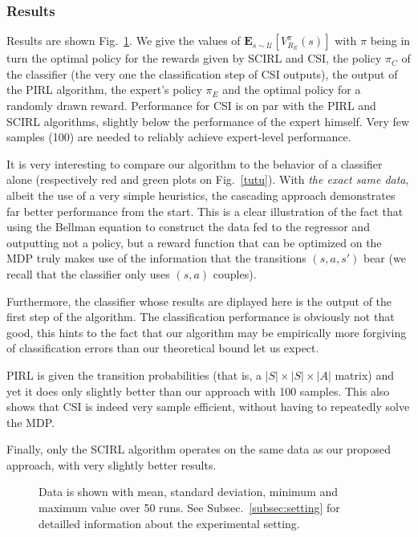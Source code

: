 \documentclass[smallextended]{svjour3}
\begin{document}
\subsubsection{Results}
\label{subsubsec:hresults}
Results are shown Fig.~\ref{fig:Highway}. We give the values of $\mathbf{E}_{s\sim\mathcal{U}}[V^{\pi}_{R_E}(s)]$ with $\pi$ being in turn the optimal policy for the rewards given by SCIRL and CSI, the policy $\pi_C$ of the classifier (the very one the classification step of CSI outputs), the output of the PIRL algorithm, the expert's policy $\pi_E$ and the optimal policy for a randomly drawn reward. Performance for CSI is on par with the PIRL and SCIRL algorithms, slightly below the performance of the expert himself. Very few samples (100) are needed to reliably achieve expert-level performance.

It is very interesting to compare our algorithm to the behavior of a classifier alone (respectively red and green plots on Fig.~\ref{tutu}). With \emph{the exact same data}, albeit the use of a very simple heuristics, the cascading approach demonstrates far better performance from the start. This is a clear illustration of the fact that using the Bellman equation to construct the data fed to the regressor and outputting not a policy, but a reward function that can be optimized on the MDP truly makes use of the information that the transitions $(s,a,s')$ bear (we recall that the classifier only uses $(s,a)$ couples).

Furthermore, the classifier whose results are diplayed here is the output of the first step of the algorithm. The classification performance is obviously not that good, this hints to the fact that our algorithm may be empirically more forgiving of classification errors than our theoretical bound let us expect.

PIRL is given the transition probabilities (that is, a $|S|\times |S|\times |A|$ matrix) and yet it does only slightly better than our approach with 100 samples. This also shows that CSI is indeed very sample efficient, without having to repeatedly solve the MDP.

Finally, only the SCIRL algorithm operates on the same data as our proposed approach, with very slightly better results.

\begin{figure}

  \caption{Data is shown with mean, standard deviation, minimum and maximum value over 50 runs. See Subsec.~\ref{subsec:setting} for detailled information about the experimental setting.}
  \label{fig:Highway}
\end{figure}
\end{document}
